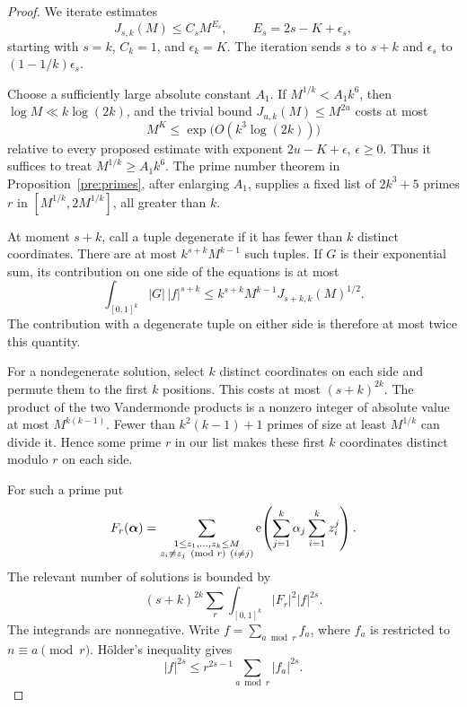 \begin{proof}
We iterate estimates
\begin{equation}\label{lp:inductive-bound}
 J_{s,k}(M)\le C_s M^{E_s},\qquad
 E_s=2s-K+\epsilon_s,
\end{equation}
starting with $s=k$, $C_k=1$, and $\epsilon_k=K$.  The iteration sends
$s$ to $s+k$ and $\epsilon_s$ to $(1-1/k)\epsilon_s$.

Choose a sufficiently large absolute constant $A_1$.  If
$M^{1/k}<A_1k^6$, then $\log M\ll k\log(2k)$, and the trivial bound
$J_{u,k}(M)\le M^{2u}$ costs at most
\begin{equation}\label{lp:small-M-cost}
 M^K\le\exp\bigl(O(k^3\log(2k))\bigr)
\end{equation}
relative to every proposed estimate with exponent $2u-K+\epsilon$,
$\epsilon\ge0$.  Thus it suffices to treat $M^{1/k}\ge A_1k^6$.
The prime number theorem in Proposition~\ref{pre:primes}, after enlarging
$A_1$, supplies a fixed list of
$2k^3+5$ primes $r$ in $[M^{1/k},2M^{1/k}]$, all greater than $k$.

At moment $s+k$, call a tuple degenerate if it has fewer than $k$
distinct coordinates.  There are at most
$k^{s+k}M^{k-1}$ such tuples.  If $G$ is their exponential sum, its
contribution on one side of the equations is at most
\[
 \int_{[0,1]^k}|G|\,|f|^{s+k}
 \le k^{s+k}M^{k-1}J_{s+k,k}(M)^{1/2}.
\]
The contribution with a degenerate tuple on either side is therefore at
most twice this quantity.

For a nondegenerate solution, select $k$ distinct coordinates on each side
and permute them to the first $k$ positions.  This costs at most
$(s+k)^{2k}$.  The product of the two Vandermonde products is a nonzero
integer of absolute value at most $M^{k(k-1)}$.  Fewer than $k^2(k-1)+1$
primes of size at least $M^{1/k}$ can divide it.  Hence some prime $r$ in
our list makes these first $k$ coordinates distinct modulo $r$ on each
side.

For such a prime put
\[
 F_r(\boldsymbol\alpha)=
 \sum_{\substack{1\le z_1,\ldots,z_k\le M\\
                  z_i\not\equiv z_j\pmod r\ (i\ne j)}}
 \mathrm{e}\!\left(\sum_{j=1}^k\alpha_j\sum_{i=1}^kz_i^j\right).
\]
The relevant number of solutions is bounded by
\[
 (s+k)^{2k}\sum_r\int_{[0,1]^k}|F_r|^2|f|^{2s}.
\]
The integrands are nonnegative.  Write $f=\sum_{a\bmod r}f_a$, where
$f_a$ is restricted to $n\equiv a\pmod r$.  H\"older's inequality gives
\[
 |f|^{2s}\le r^{2s-1}\sum_{a\bmod r}|f_a|^{2s}.
\]


\end{proof}
